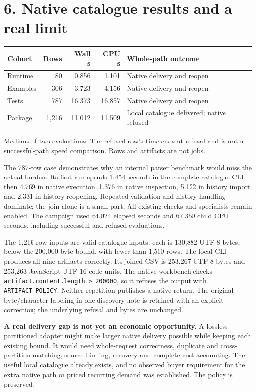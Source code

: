 \documentclass[11pt,letterpaper]{article}
\newcommand{\code}[1]{{\small\nolinkurl{#1}}}
\newcommand{\sect}[1]{\section*{#1}}
\begin{document}
\sect{6. Native catalogue results and a real limit}
\begin{tabularx}{\linewidth}{@{}p{.20\linewidth}r r r Y@{}}
\toprule
\textbf{Cohort} & \textbf{Rows} & \textbf{Wall s} & \textbf{CPU s} & \textbf{Whole-path outcome}\\
\midrule
Runtime & 80 & 0.856 & 1.101 & Native delivery and reopen\\
Examples & 306 & 3.723 & 4.156 & Native delivery and reopen\\
Tests & 787 & 16.373 & 16.857 & Native delivery and reopen\\
Package & 1,216 & 11.012 & 11.509 & Local catalogue delivered; native refused\\
\bottomrule
\end{tabularx}
{\footnotesize Medians of two evaluations. The refused row's time ends at refusal and is not a successful-path speed comparison. Rows and artifacts are not jobs.}\par

The 787-row case demonstrates why an internal parser benchmark would miss the actual burden. Its first run spends 1.454 seconds in the complete catalogue CLI, then 4.769 in native execution, 1.376 in native inspection, 5.122 in history import and 2.331 in history reopening. Repeated validation and history handling dominate; the join alone is a small part. All existing checks and specialists remain enabled. The campaign used 64.024 elapsed seconds and 67.350 child CPU seconds, including successful and refused evaluations.\cite{catalogprofile}

The 1,216-row inputs are valid catalogue inputs: each is 130,882 UTF-8 bytes, below the 200,000-byte bound, with fewer than 1,500 rows. The local CLI produces all nine artifacts correctly. Its joined CSV is 253,267 UTF-8 bytes and 253,263 JavaScript UTF-16 code units. The native workbench checks \code{artifact.content.length > 200000}, so it refuses the output with \code{ARTIFACT_POLICY}. Neither repetition publishes a native return. The original byte/character labeling in one discovery note is retained with an explicit correction; the underlying refusal and bytes are unchanged.\cite{nativepolicy}

\begin{finding}
\textbf{A real delivery gap is not yet an economic opportunity.} A lossless partitioned adapter might make larger native delivery possible while keeping each existing bound. It would need whole-request correctness, duplicate and cross-partition matching, source binding, recovery and complete cost accounting. The useful local catalogue already exists, and no observed buyer requirement for the extra native path or priced recurring demand was established. The policy is preserved.
\end{finding}
\end{document}
